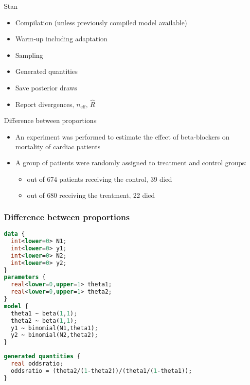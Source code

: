 \documentclass[finnish,english,t]{beamer}
\def\eff{\mathrm{eff}}
\begin{document}
\begin{frame}{Stan}
  
  \begin{itemize}
  \item Compilation (unless previously compiled model available)
  \item Warm-up including adaptation
  \item Sampling
  \item Generated quantities
  \item Save posterior draws
  \item Report divergences, $n_\eff$, $\widehat{R}$
  \end{itemize}

\end{frame}

\begin{frame}{Difference between proportions}
  
\begin{itemize}
  \item An experiment was performed to estimate the effect of
    beta-blockers on mortality of cardiac patients
  \item A group of
    patients were randomly assigned to treatment and control groups:
    \begin{itemize}
    \item out of 674 patients receiving the control, 39 died
    \item out of 680 receiving the treatment, 22 died
    \end{itemize}
  \end{itemize}
\end{frame}

\begin{frame}[fragile]
  \frametitle{Difference between proportions}

  
  \vspace{-0.5\baselineskip}
  {\small\color{gray}
    {
\begin{lstlisting}[language=Stan]
data {
  int<lower=0> N1;
  int<lower=0> y1;
  int<lower=0> N2;
  int<lower=0> y2;
}
parameters {
  real<lower=0,upper=1> theta1;
  real<lower=0,upper=1> theta2;
}
model {
  theta1 ~ beta(1,1);
  theta2 ~ beta(1,1);
  y1 ~ binomial(N1,theta1);
  y2 ~ binomial(N2,theta2);
}
\end{lstlisting}
    }
    {
\begin{lstlisting}[language=Stan]
generated quantities {
  real oddsratio;
  oddsratio = (theta2/(1-theta2))/(theta1/(1-theta1));
}
\end{lstlisting}
    }
  }
\end{frame}
\end{document}
